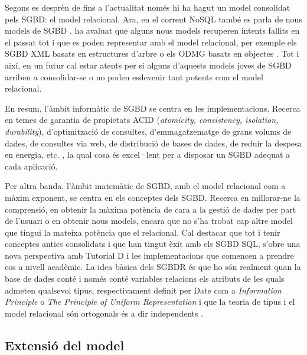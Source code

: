 Segons es desprèn de \textcite{date06} fins a l'actualitat només hi ha hagut un model consolidat pels SGBD: el model relacional. 
Ara, en el corrent NoSQL també es parla de nous models de SGBD \parencite{edlich:nosql,stonebraker09:scidb}.
\citeauthor{date06} ha avaluat que alguns nous models recuperen intents fallits en el passat tot i que es poden representar amb el model relacional, per exemple els SGBD XML basats en estructures d'arbre \parencite[cap.~14]{date06} o els ODMG basats en objectes \parencite[cap.~27]{date06}. Tot i així, en un futur cal estar atents per si alguns d'aquests models joves de SGBD arriben a consolidar-se o no poden esdevenir tant potents com el model relacional.


En resum, l'àmbit informàtic de SGBD se centra en les implementacions. Recerca en temes de garantia de propietats ACID (\emph{atomicity, consistency, isolation, durability}), d'optimització de consultes, d'emmagatzematge de grans volums de dades, de consultes via web, de distribució de bases de dades, de reduir la despesa en energia, etc. \parencite{stonebraker07,stonebraker10}, la qual cosa és excel·lent per a disposar un SGBD adequat a cada aplicació. 

Per altra banda, l'àmbit matemàtic de SGBD, amb el model relacional com a màxim exponent, se centra en els conceptes dels SGBD. Recerca en millorar-ne la comprensió, en obtenir la màxima potència de cara a la gestió de dades per part de l'usuari o en obtenir nous models, encara que  no s'ha trobat cap altre model que tingui la mateixa potència que el relacional. Cal destacar que tot i tenir conceptes antics consolidats i que han tingut èxit amb els SGBD SQL, s'obre una nova perspectiva amb Tutorial D i les implementacions que comencen a prendre cos  a nivell acadèmic. La idea bàsica dels SGBDR és que ho són realment quan la base de dades conté i només conté variables relacions els atributs de les quals admeten qualsevol tipus, respectivament definit per Date com a \emph{Information Principle} o \emph{The Principle of Uniform Representation} \parencite{date:dictionary} i que la teoria de tipus i el model relacional són ortogonals és a dir independents \parencite[cap.~6]{date06}.







\subsection{Extensió del model}

